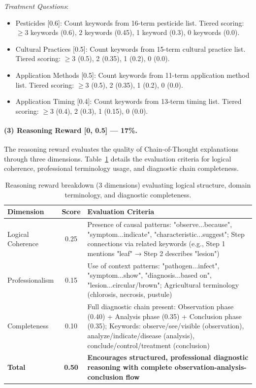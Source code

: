 \documentclass[11pt]{article}
\begin{document}
\noindent\textit{Treatment Questions}:
\begin{itemize}
\setlength{\itemsep}{0pt}
\item Pesticides [0.6]: Count keywords from 16-term pesticide list. Tiered scoring: $\geq$3 keywords (0.6), 2 keywords (0.45), 1 keyword (0.3), 0 keywords (0.0).
\item Cultural Practices [0.5]: Count keywords from 15-term cultural practice list. Tiered scoring: $\geq$3 (0.5), 2 (0.35), 1 (0.2), 0 (0.0).
\item Application Methods [0.5]: Count keywords from 11-term application method list. Tiered scoring: $\geq$3 (0.5), 2 (0.35), 1 (0.2), 0 (0.0).
\item Application Timing [0.4]: Count keywords from 13-term timing list. Tiered scoring: $\geq$3 (0.4), 2 (0.3), 1 (0.15), 0 (0.0).
\end{itemize}

\paragraph{(3) Reasoning Reward [0, 0.5] — 17\%.}

\noindent The reasoning reward evaluates the quality of Chain-of-Thought explanations through three dimensions. Table~\ref{tab:reasoning_reward} details the evaluation criteria for logical coherence, professional terminology usage, and diagnostic chain completeness.

\begin{table}[t]
\centering
\small
\setlength{\tabcolsep}{6pt}
\begin{tabular}{lcp{11cm}}
\hline
\textbf{Dimension} & \textbf{Score} & \textbf{Evaluation Criteria} \\
\hline
Logical Coherence & 0.25 & Presence of causal patterns: "observe...because", "symptom...indicate", "characteristic...suggest"; Step connections via related keywords (e.g., Step 1 mentions "leaf" → Step 2 describes "lesion") \\
Professionalism & 0.15 & Use of context patterns: "pathogen...infect", "symptom...show", "diagnosis...based on", "lesion...circular/brown"; Agricultural terminology (chlorosis, necrosis, pustule) \\
Completeness & 0.10 & Full diagnostic chain present: Observation phase (0.40) + Analysis phase (0.35) + Conclusion phase (0.35); Keywords: observe/see/visible (observation), analyze/indicate/disease (analysis), conclude/control/treatment (conclusion) \\
\hline
\textbf{Total} & \textbf{0.50} & \textbf{Encourages structured, professional diagnostic reasoning with complete observation-analysis-conclusion flow} \\
\hline
\end{tabular}
\caption{Reasoning reward breakdown (3 dimensions) evaluating logical structure, domain terminology, and diagnostic completeness.}
\label{tab:reasoning_reward}
\end{table}
\end{document}
